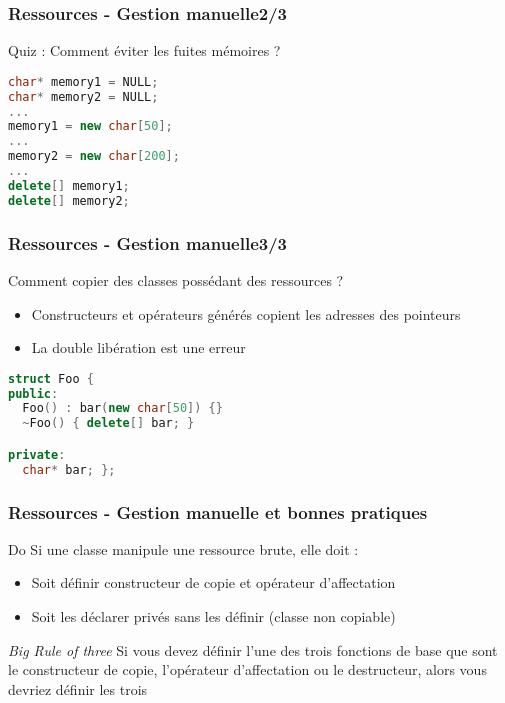 \documentclass[C++.tex]{subfiles}
\begin{document}
\begin{frame}[fragile]
	\frametitle{Ressources - Gestion manuelle\titlehfill{}2/3}
	\begin{block}{Quiz : Comment éviter les fuites mémoires ?}
		\begin{lstlisting}[language=C++]
char* memory1 = NULL;
char* memory2 = NULL;
...
memory1 = new char[50];
...
memory2 = new char[200];
...
delete[] memory1;
delete[] memory2;\end{lstlisting}
	\end{block}
\end{frame}

\begin{frame}[fragile]
	\frametitle{Ressources - Gestion manuelle\titlehfill{}3/3}
	\begin{alertblock}{}
		Comment copier des classes possédant des ressources ?
	\end{alertblock}

	\begin{itemize}
		\item Constructeurs et opérateurs générés copient les adresses des pointeurs
		\item La double libération est une erreur
	\end{itemize}

	\begin{lstlisting}[language=C++]
struct Foo {
public:
  Foo() : bar(new char[50]) {}
  ~Foo() { delete[] bar; }

private:
  char* bar; };\end{lstlisting}
\end{frame}

\begin{frame}
	\frametitle{Ressources - Gestion manuelle et bonnes pratiques}
	\begin{exampleblock}{Do}
		Si une classe manipule une ressource brute, elle doit :
		\begin{itemize}
			\item Soit définir constructeur de copie et opérateur d'affectation
			\item Soit les déclarer privés sans les définir (classe non copiable)
		\end{itemize}
	\end{exampleblock}

	\begin{exampleblock}{\textit{Big Rule of three}}
		Si vous devez définir l'une des trois fonctions de base que sont le constructeur de copie, l'opérateur d'affectation ou le destructeur, alors vous devriez définir les trois


	\end{exampleblock}

\end{frame}
\end{document}
